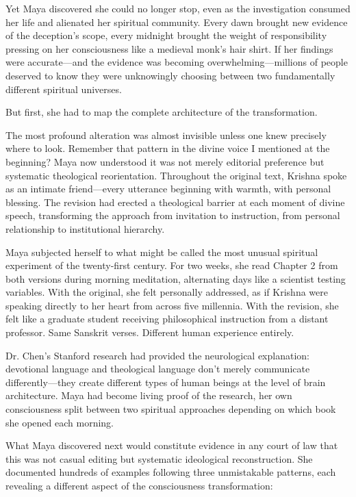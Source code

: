 \documentclass[11pt,twoside]{book}
\begin{document}
Yet Maya discovered she could no longer stop, even as the investigation consumed her life and alienated her spiritual community. Every dawn brought new evidence of the deception's scope, every midnight brought the weight of responsibility pressing on her consciousness like a medieval monk's hair shirt. If her findings were accurate—and the evidence was becoming overwhelming—millions of people deserved to know they were unknowingly choosing between two fundamentally different spiritual universes.

But first, she had to map the complete architecture of the transformation.

The most profound alteration was almost invisible unless one knew precisely where to look. Remember that pattern in the divine voice I mentioned at the beginning? Maya now understood it was not merely editorial preference but systematic theological reorientation. Throughout the original text, Krishna spoke as an intimate friend—every utterance beginning with warmth, with personal blessing. The revision had erected a theological barrier at each moment of divine speech, transforming the approach from invitation to instruction, from personal relationship to institutional hierarchy.

Maya subjected herself to what might be called the most unusual spiritual experiment of the twenty-first century. For two weeks, she read Chapter 2 from both versions during morning meditation, alternating days like a scientist testing variables. With the original, she felt personally addressed, as if Krishna were speaking directly to her heart from across five millennia. With the revision, she felt like a graduate student receiving philosophical instruction from a distant professor. Same Sanskrit verses. Different human experience entirely.

Dr. Chen's Stanford research had provided the neurological explanation: devotional language and theological language don't merely communicate differently—they create different types of human beings at the level of brain architecture. Maya had become living proof of the research, her own consciousness split between two spiritual approaches depending on which book she opened each morning.

What Maya discovered next would constitute evidence in any court of law that this was not casual editing but systematic ideological reconstruction. She documented hundreds of examples following three unmistakable patterns, each revealing a different aspect of the consciousness transformation:
\end{document}
